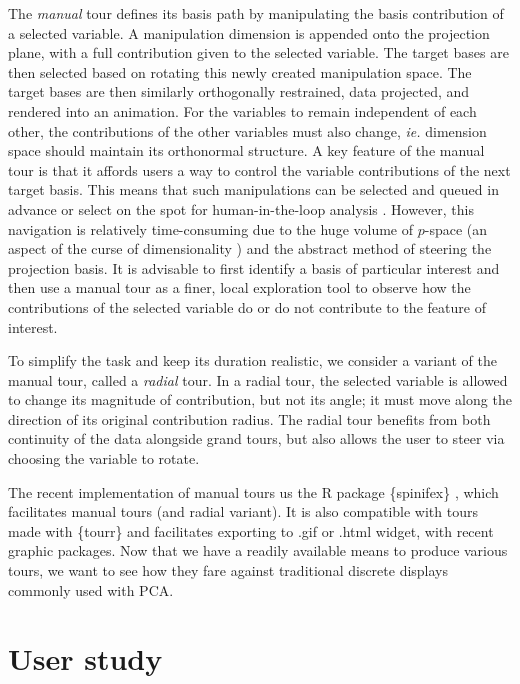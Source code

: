 \documentclass{monashthesis}
\begin{document}
The \emph{manual} tour \autocite{cook_manual_1997} defines its basis path by manipulating the basis contribution of a selected variable. A manipulation dimension is appended onto the projection plane, with a full contribution given to the selected variable. The target bases are then selected based on rotating this newly created manipulation space. The target bases are then similarly orthogonally restrained, data projected, and rendered into an animation. For the variables to remain independent of each other, the contributions of the other variables must also change, \emph{ie.} dimension space should maintain its orthonormal structure. A key feature of the manual tour is that it affords users a way to control the variable contributions of the next target basis. This means that such manipulations can be selected and queued in advance or select on the spot for human-in-the-loop analysis \autocite{karwowski_international_2006}. However, this navigation is relatively time-consuming due to the huge volume of \(p\)-space (an aspect of the curse of dimensionality \autocite{bellman_dynamic_1957}) and the abstract method of steering the projection basis. It is advisable to first identify a basis of particular interest and then use a manual tour as a finer, local exploration tool to observe how the contributions of the selected variable do or do not contribute to the feature of interest.

To simplify the task and keep its duration realistic, we consider a variant of the manual tour, called a \emph{radial} tour. In a radial tour, the selected variable is allowed to change its magnitude of contribution, but not its angle; it must move along the direction of its original contribution radius. The radial tour benefits from both continuity of the data alongside grand tours, but also allows the user to steer via choosing the variable to rotate.

The recent implementation of manual tours us the R package \{spinifex\} \autocite{spyrison_spinifex_2020}, which facilitates manual tours (and radial variant). It is also compatible with tours made with \{tourr\} \autocite{wickham_tourr:_2011} and facilitates exporting to .gif or .html widget, with recent graphic packages. Now that we have a readily available means to produce various tours, we want to see how they fare against traditional discrete displays commonly used with PCA.

\hypertarget{sec:userstudy}{%
\section{User study}\label{sec:userstudy}}
\end{document}

